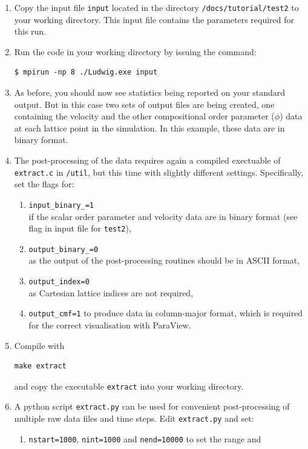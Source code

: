 \documentclass[11pt,twoside,a4paper]{article}
\begin{document}
\begin{enumerate}
\item Copy the input file \texttt{input} located in the directory 
\texttt{/docs/tutorial/test2} 
to your working directory. This input file contains the parameters required for this run. 
\item Run the code in your working directory by issuing the command:
\begin{lstlisting}
$ mpirun -np 8 ./Ludwig.exe input
\end{lstlisting}
\item As before, you should now see statistics being reported on your standard output. But 
in this case two sets of output files are being created, one containing the velocity and 
the other compositional order parameter ($\phi$) data at each lattice point in the simulation. 
In this example, these data are in binary format.
\item The post-processing of the data requires again a compiled exectuable of \texttt{extract.c} in
\texttt{/util}, but this time with slightly different settings. Specifically, set the flags for:
\begin{enumerate}
\item \texttt{input\_binary\_=1} \\ if the scalar order parameter and velocity data are in binary format (see 
flag in input file for \texttt{test2}),
\item \texttt{output\_binary\_=0} \\ as the output of the post-processing routines should be 
in ASCII format,
\item \texttt{output\_index=0} \\ as Cartesian lattice indices are not required, 
\item \texttt{output\_cmf=1} to produce data in column-major format, which is required for the correct 
visualisation with ParaView.
\end{enumerate}
\item Compile with 
\begin{lstlisting}
make extract
\end{lstlisting} 
and copy the executable \texttt{extract} into your working directory.
\item A python script \texttt{extract.py}
can be used for convenient post-processing of multiple raw data files and time steps.
 Edit \texttt{extract.py} and set:
\begin{enumerate}
\item \texttt{nstart=1000}, \texttt{nint=1000} and \texttt{nend=10000} to set the range and 

\end{enumerate}
\end{enumerate}
\end{document}
